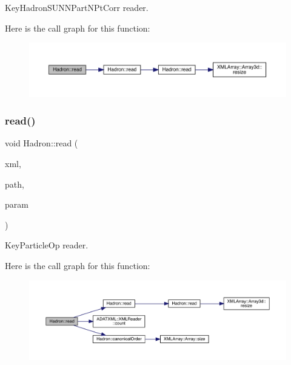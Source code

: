 Key\+Hadron\+S\+U\+N\+N\+Part\+N\+Pt\+Corr reader. 

Here is the call graph for this function\+:\nopagebreak
\begin{figure}[H]
\begin{center}
\leavevmode
\includegraphics[width=350pt]{d1/daf/namespaceHadron_a921e2dea91400934dabd596c18164033_cgraph}
\end{center}
\end{figure}
\mbox{\label{namespaceHadron_aa490647cc42691054f51d9885e6ec91c}} 
\subsubsection{\texorpdfstring{read()}{read()}\hspace{0.1cm}{\footnotesize\ttfamily [17/94]}}
{\footnotesize\ttfamily void Hadron\+::read (\begin{DoxyParamCaption}\item[{\mbox{\hyperlink{classADATXML_1_1XMLReader}{X\+M\+L\+Reader}} \&}]{xml,  }\item[{const std\+::string \&}]{path,  }\item[{\mbox{\hyperlink{structHadron_1_1KeyParticleOp__t}{Key\+Particle\+Op\+\_\+t}} \&}]{param }\end{DoxyParamCaption})}



Key\+Particle\+Op reader. 

Here is the call graph for this function\+:\nopagebreak
\begin{figure}[H]
\begin{center}
\leavevmode
\includegraphics[width=350pt]{d1/daf/namespaceHadron_aa490647cc42691054f51d9885e6ec91c_cgraph}
\end{center}
\end{figure}
\mbox{\label{namespaceHadron_ad46ef728c9d609cbf63217c66bdf0285}} 
